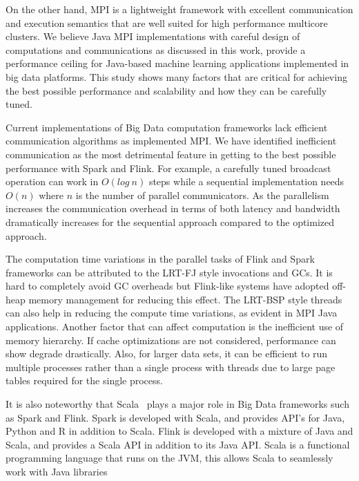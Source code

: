 \documentclass[10pt, conference, compsocconf]{IEEEtran}
\begin{document}
On the other hand, \ac{MPI} is a lightweight framework with excellent communication and execution semantics that are well suited for high performance multicore clusters. We believe Java \ac{MPI} implementations with careful design of computations and communications as discussed in this work, provide a performance ceiling for Java-based machine learning applications implemented in big data platforms. This study shows many factors that are critical for achieving the best possible performance and scalability and how they can be carefully tuned. 

Current implementations of Big Data computation frameworks lack efficient communication algorithms as implemented \ac{MPI}. We have identified inefficient communication as the most detrimental feature in getting to the best possible performance with Spark and Flink. For example, a carefully tuned broadcast operation can work in $O(log\ n)$ steps while a sequential implementation needs $O(n)$ where $n$ is the number of parallel communicators. As the parallelism increases the communication overhead in terms of both latency and bandwidth dramatically increases for the sequential approach compared to the optimized approach.

The computation time variations in the parallel tasks of Flink and Spark frameworks can be attributed to the \ac{LRT-FJ} style invocations and \acp{GC}. It is hard to completely avoid \ac{GC} overheads but Flink-like systems have adopted off-heap memory management for reducing this effect. The \ac{LRT-BSP} style threads can also help in reducing the compute time variations, as evident in \ac{MPI} Java applications. Another factor that can affect computation is the inefficient use of memory hierarchy. If cache optimizations are not considered, performance can show degrade drastically. Also, for larger data sets, it can be efficient to run multiple processes rather than a single process with threads due to large page tables required for the single process.   

It is also noteworthy that Scala~\cite{scalalang} plays a major role in Big Data frameworks such as Spark and Flink. Spark is developed with Scala, and provides \ac{API}'s for Java, Python and R in addition to Scala. Flink is developed with a mixture of Java and Scala, and provides a Scala \ac{API} in addition to its Java \ac{API}. Scala is a functional programming language that runs on the \ac{JVM}, this allows Scala to seamlessly work with Java libraries
\end{document}
